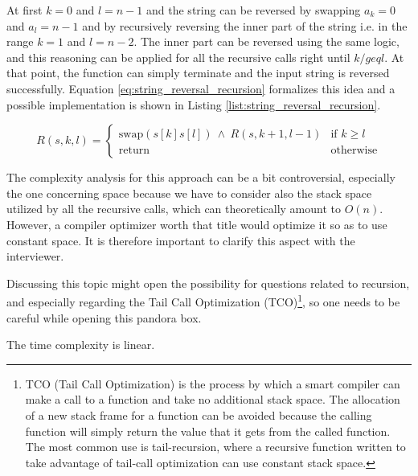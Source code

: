 At first $k=0$ and $l=n-1$ and the string can be reversed by swapping $a_k=0$ and $a_l=n-1$ and
by recursively reversing the inner part of the string i.e. in the range $k=1$ and $l=n-2$.
The inner part can be reversed using the same logic, and this reasoning can be applied for all the recursive calls right until $k /geq l$. At that point, the function can simply terminate and the input string is reversed successfully.
Equation \ref{eq:string_reversal_recursion} formalizes this idea and a possible implementation is shown in Listing \ref{list:string_reversal_recursion}.

\begin{equation}
	R(s, k, l)=
	\begin{cases} 
		\text{swap}(s[k]s[l]) \: \wedge \: R(s,k+1, l-1) & \text{if } k\geq l\\
		\text{return} & \text{otherwise}
	\end{cases}
\label{eq:string_reversal_recursion}
\end{equation} 





The complexity analysis for this approach can be a bit controversial, especially the one concerning space because we have to consider also
the stack space utilized by all the recursive calls, which can theoretically amount to $O(n)$. However, a compiler optimizer worth that title would optimize it so as to use constant space. 
It is therefore important to clarify this aspect with the interviewer.

Discussing this topic might open the possibility for questions related
to recursion, and especially regarding the
Tail Call Optimization (TCO)\footnote{TCO (Tail Call Optimization) is the process by which a smart compiler can make a call to a function and take no additional stack space. The allocation of a new stack frame for a function can be avoided because the calling function will simply return the value that it gets from the called function. The most common use is tail-recursion, where a recursive function written to take advantage of tail-call optimization can	use constant stack space.\nopagebreak}, so one needs to be careful while opening this pandora box.

The time complexity is linear. 
